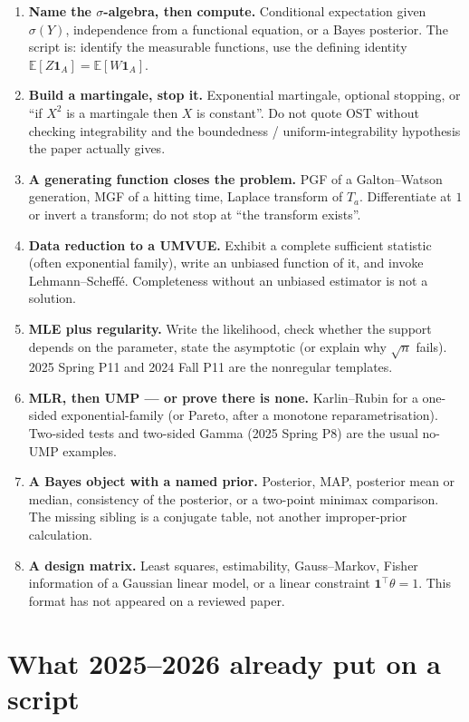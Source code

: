 \begin{enumerate}
    \item \textbf{Name the \(\sigma\)-algebra, then compute.} Conditional expectation given \(\sigma(Y)\), independence from a functional equation, or a Bayes posterior. The script is: identify the measurable functions, use the defining identity \(\mathbb{E}[Z\mathbf{1}_{A}]=\mathbb{E}[W\mathbf{1}_{A}]\).
    \item \textbf{Build a martingale, stop it.} Exponential martingale, optional stopping, or ``if \(X^{2}\) is a martingale then \(X\) is constant''. Do not quote OST without checking integrability and the boundedness / uniform-integrability hypothesis the paper actually gives.
    \item \textbf{A generating function closes the problem.} PGF of a Galton--Watson generation, MGF of a hitting time, Laplace transform of \(T_{a}\). Differentiate at \(1\) or invert a transform; do not stop at ``the transform exists''.
    \item \textbf{Data reduction to a UMVUE.} Exhibit a complete sufficient statistic (often exponential family), write an unbiased function of it, and invoke Lehmann--Scheffé. Completeness without an unbiased estimator is not a solution.
    \item \textbf{MLE plus regularity.} Write the likelihood, check whether the support depends on the parameter, state the asymptotic (or explain why \(\sqrt{n}\) fails). 2025 Spring P11 and 2024 Fall P11 are the nonregular templates.
    \item \textbf{MLR, then UMP --- or prove there is none.} Karlin--Rubin for a one-sided exponential-family (or Pareto, after a monotone reparametrisation). Two-sided tests and two-sided Gamma (2025 Spring P8) are the usual no-UMP examples.
    \item \textbf{A Bayes object with a named prior.} Posterior, MAP, posterior mean or median, consistency of the posterior, or a two-point minimax comparison. The missing sibling is a conjugate table, not another improper-prior calculation.
    \item \textbf{A design matrix.} Least squares, estimability, Gauss--Markov, Fisher information of a Gaussian linear model, or a linear constraint \(\mathbf{1}^{\top}\theta=1\). This format has not appeared on a reviewed paper.
\end{enumerate}

\section{What 2025--2026 already put on a script}
\label{sec:covered}

